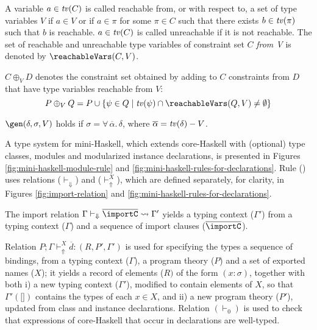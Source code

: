 A variable $a\in \text{\it tv\/}(C)$ is called reachable from, or with respect to,
a set of type variables $V$ if $a\in V$ or if $a\in \pi$ for some
$\pi\in C$ such that there exists $b\in \text{\it tv\/}(\pi)$ such that $b$ is
reachable. $a\in \text{\it tv\/}(C)$ is called unreachable if it is not
reachable. The set of reachable and unreachable type variables of
constraint set $C$ {\em from V\/} is denoted by $\reachableVars(C,V)$.


$C \oplus_V D$ denotes the constraint set obtained by adding to $C$
constraints from $D$ that have type variables reachable from $V$:
  \[ P \oplus_V Q = P \cup \{ \psi \in Q \mid \tv(\psi) \cap \reachableVars(Q,V) \not= \emptyset \} \]

$\gen(\delta,\sigma,V)$ holds if
  $\sigma=\forall\,\overline{\alpha}.\,\delta$, where
  $\overline{\alpha}=\text{\it tv\/}(\delta) - V$.

A type system for mini-Haskell, which extends core-Haskell with
(optional) type classes, modules and modularized instance
declarations, is presented in Figures
\ref{fig:mini-haskell-module-rule} and
\ref{fig:mini-haskell-rules-for-declarations}. Rule (\MODULE) uses
relations ($\vdash_{\Downarrow}$) and ($\vdash_{\Uparrow}^X$), which
are defined separately, for clarity, in Figures
\ref{fig:import-relation} and
\ref{fig:mini-haskell-rules-for-declarations}.

The import relation $\Gamma \vdash_{\Downarrow} \overline{\importC}
\leadsto \Gamma'$ yields a typing context ($\Gamma'$) from a typing
context ($\Gamma$) and a sequence of import clauses
($\overline{\importC}$).

Relation $P;\Gamma \vdash_{\Uparrow}^X \overline{\!d}:(R,P',\Gamma')$
is used for specifying the types a sequence of bindings, from a typing
context ($\Gamma$), a program theory ($P$) and a set of exported names
($X$); it yields a record of elements ($R)$ of the form $(x:\sigma)$,
together with both i) a new typing context ($\Gamma'$), modified to
contain elements of $X$, so that $\Gamma'(\texttt{[]})$ contains the
types of each $x\in X$, and ii) a new program theory ($P'$), updated
from class and instance declarations.  Relation $(\vdash_0)$ is used
to check that expressions of core-Haskell that occur in declarations
are well-typed.

